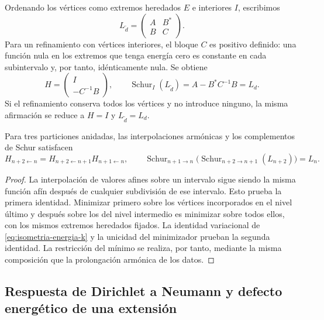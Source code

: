 Ordenando los vértices como extremos heredados \(E\) e interiores \(I\),
escribimos
\[
 L_{\widetilde d}=\begin{pmatrix}A&B^*\\B&C\end{pmatrix}.
\]
Para un refinamiento con vértices interiores, el bloque \(C\) es
positivo definido: una función nula en los extremos
que tenga energía cero es constante en cada subintervalo y, por tanto,
idénticamente nula. Se obtiene
\begin{equation}
 H=\begin{pmatrix}I\\-C^{-1}B\end{pmatrix},\qquad
 \operatorname{Schur}_{I}(L_{\widetilde d})
 =A-B^*C^{-1}B=L_d.
 \label{eq:schur-intervalar-k}
\end{equation}
Si el refinamiento conserva todos los vértices y no introduce ninguno,
la misma afirmación se reduce a \(H=I\) y \(L_{\widetilde d}=L_d\).

\begin{proposition}
\label{prop:energia-naturalidad-sucesiva}
Para tres particiones anidadas, las interpolaciones armónicas y los
complementos de Schur satisfacen
\begin{equation}
 H_{n+2\leftarrow n}
 =H_{n+2\leftarrow n+1}H_{n+1\leftarrow n},
 \qquad
 \operatorname{Schur}_{n+1\to n}
 \bigl(\operatorname{Schur}_{n+2\to n+1}(L_{n+2})\bigr)=L_n.
 \label{eq:energia-naturalidad-sucesiva}
\end{equation}
\end{proposition}
\begin{proof}
La interpolación de valores afines sobre un intervalo sigue siendo la
misma función afín después de cualquier subdivisión de ese intervalo.
Esto prueba la primera identidad. Minimizar primero sobre los vértices
incorporados en el nivel último y después sobre los del nivel intermedio
es minimizar sobre todos ellos, con los mismos extremos heredados fijados.
La identidad variacional de \eqref{eq:isometria-energia-k} y la unicidad
del minimizador prueban la segunda identidad. La restricción del mínimo
se realiza, por tanto, mediante la misma composición que la prolongación
armónica de los datos.
\end{proof}

\subsection{Respuesta de Dirichlet a Neumann y defecto energético de una extensión}

